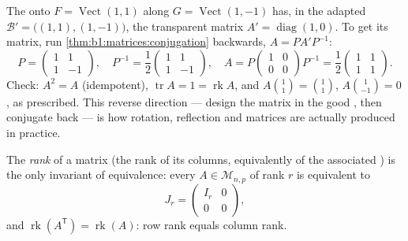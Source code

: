 \begin{example}
\label{ex:b1:matrices:reverserun}
The  onto $F = \operatorname{Vect}(1,1)$ along $G =
\operatorname{Vect}(1,-1)$ has, in the adapted  $\mathcal
B' = \bigl((1,1),(1,-1)\bigr)$, the transparent matrix $A' =
\operatorname{diag}(1, 0)$. To get its  matrix,
run \cref{thm:b1:matrices:conjugation} backwards, $A = P A'
P^{-1}$:
\[
P = \begin{pmatrix} 1 & 1\\ 1 & -1\end{pmatrix},
\quad
P^{-1} = \frac12\begin{pmatrix} 1 & 1\\ 1 & -1\end{pmatrix},
\quad
A = P\begin{pmatrix} 1 & 0\\ 0 & 0\end{pmatrix}P^{-1}
= \frac12\begin{pmatrix} 1 & 1\\ 1 & 1\end{pmatrix}.
\]
Check: $A^2 = A$ (idempotent), $\operatorname{tr} A = 1 =
\operatorname{rk} A$, and $A\binom{1}{1} = \binom11$,
$A\binom{1}{-1} = 0$, as prescribed. This reverse direction ---
design the matrix in the good , then conjugate back --- is
how rotation, reflection and  matrices are actually
produced in practice.
\end{example}

\begin{theorem}\label{thm:b1:matrices:rank}
The \emph{rank} of a matrix (the rank of its columns, equivalently
of the associated ) is the only invariant of equivalence:
every $A \in \mathcal{M}_{n,p}$ of rank $r$ is equivalent to
\[
J_r = \begin{pmatrix} I_r & 0 \\ 0 & 0 \end{pmatrix},
\]
and $\operatorname{rk}(A^{\mathsf T}) = \operatorname{rk}(A)$: row rank
equals column rank.
\end{theorem}

